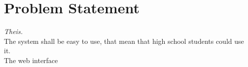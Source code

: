 \section{Problem Statement}\textit{Theis.}\\
The system shall be easy to use, that mean that high school students could use it.\\
The web interface 